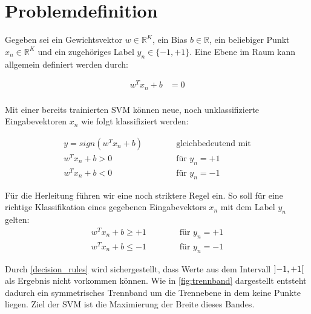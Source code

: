 \documentclass[a4paper,11pt,twoside]{scrreprt}
\begin{document}
\section{Problemdefinition} \label{sec:problem_def}
Gegeben sei ein Gewichtsvektor $w \in \mathbb{R}^{K}$, ein Bias $b \in \mathbb{R}$, ein beliebiger Punkt $x_{n} \in \mathbb{R}^{K}$ und ein zugehöriges Label $y_{n} \in \{-1, +1\}$. Eine Ebene im Raum kann allgemein definiert werden durch:

\begin{equation} \label{plane_eq}
    \begin{aligned}
    w^{T} x_{n} + b &= 0 \\
    \end{aligned}
\end{equation}

Mit einer bereits trainierten \ac{SVM} können neue, noch unklassifizierte Eingabevektoren $x_{n}$ wie folgt klassifiziert werden:

\begin{subequations} \label{svm_classify1}
	\begin{alignat}{2}
		y = sign(w^{T} x_{n} + b)  & \qquad & \text{ gleichbedeutend mit} \\
		w^{T} x_{n} + b > 0 & & \text{ für } y_{n} = +1\\
		w^{T} x_{n} + b < 0 & & \text{ für } y_{n} = -1
	\end{alignat}
\end{subequations}


Für die Herleitung führen wir eine noch striktere Regel ein. So soll für eine richtige Klassifikation eines gegebenen Eingabevektors $x_{n}$ mit dem Label $y_{n}$ gelten:
\begin{subequations} \label{decision_rules}
	\begin{alignat}{2}
		w^{T} x_{n} + b \geq +1 & \qquad & \text{ für } y_{n} = +1\\
		w^{T} x_{n} + b \leq -1 & & \text{ für } y_{n} = -1
	\end{alignat}
\end{subequations}


Durch \autoref{decision_rules} wird sichergestellt, dass Werte aus dem Intervall $\interval[open]{-1}{+1}$ als Ergebnis nicht vorkommen können. Wie in \autoref{fig:trennband} dargestellt entsteht dadurch ein symmetrisches Trennband um die Trennebene in dem keine Punkte liegen. Ziel der \ac{SVM} ist die Maximierung der Breite dieses Bandes.\\
\end{document}
